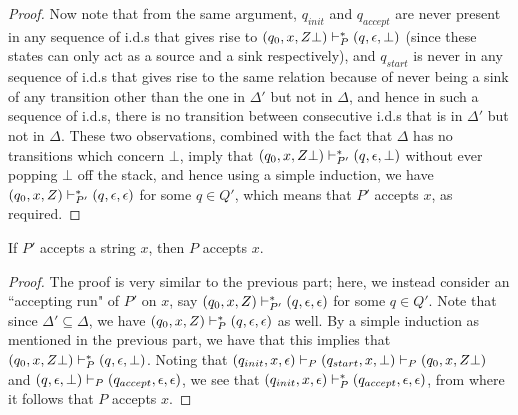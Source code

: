\begin{soln}
\begin{proof}
        Now note that from the same argument, $q_{init}$ and $q_{accept}$ are never present in any sequence of i.d.s that gives rise to $(q_0, x, Z\bot) \vdash_{P}^* (q, \epsilon, \bot)$ (since
        these states can only act as a source and a sink respectively), and $q_{start}$ is never in any sequence of i.d.s that gives rise to the same relation because of never being
        a sink of any transition other than the one in $\Delta'$ but not in $\Delta$, and hence in such a sequence of i.d.s, there is no transition between consecutive i.d.s that is in $\Delta'$ but not in
        $\Delta$. These two observations, combined with the fact that $\Delta$ has no transitions which concern $\bot$, imply that $(q_0, x, Z\bot) \vdash_{P'}^* (q, \epsilon, \bot)$
        without ever popping $\bot$ off the stack, and hence using a simple induction, we have $(q_0, x, Z) \vdash_{P'}^* (q, \epsilon, \epsilon)$ for some $q \in Q'$, which means that
        $P'$ accepts $x$, as required.
    \end{proof}
    \begin{claim}
        If $P'$ accepts a string $x$, then $P$ accepts $x$.
    \end{claim}
    \begin{proof}
        The proof is very similar to the previous part; here, we instead consider an ``accepting run" of $P'$ on $x$, say $(q_0, x, Z) \vdash_{P'}^* (q, \epsilon,
        \epsilon)$ for some $q \in Q'$. Note that since $\Delta' \subseteq \Delta$, we have $(q_0, x, Z) \vdash_{P}^* (q, \epsilon, \epsilon)$ as well. By a simple induction as
        mentioned in the previous part, we have that
        this implies that $(q_0, x, Z\bot) \vdash_{P}^* (q, \epsilon, \bot)$. Noting that $(q_{init}, x, \epsilon) \vdash_{P} (q_{start}, x, \bot) \vdash_{P} (q_0, x, Z\bot)$ and $(q, \epsilon, \bot) \vdash_{P}
        (q_{accept}, \epsilon, \epsilon)$, we see that $(q_{init}, x, \epsilon) \vdash_{P}^* (q_{accept}, \epsilon, \epsilon)$, from where it follows that $P$ accepts $x$.
    \end{proof}
\end{soln}
